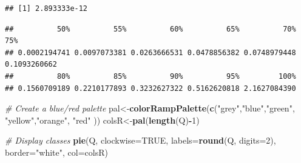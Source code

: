\documentclass[
]{article}
\newenvironment{Shaded}{\begin{snugshade}}{\end{snugshade}}
\newcommand{\AttributeTok}[1]{\textcolor[rgb]{0.13,0.29,0.53}{#1}}
\newcommand{\CommentTok}[1]{\textcolor[rgb]{0.56,0.35,0.01}{\textit{#1}}}
\newcommand{\ConstantTok}[1]{\textcolor[rgb]{0.56,0.35,0.01}{#1}}
\newcommand{\DecValTok}[1]{\textcolor[rgb]{0.00,0.00,0.81}{#1}}
\newcommand{\FloatTok}[1]{\textcolor[rgb]{0.00,0.00,0.81}{#1}}
\newcommand{\FunctionTok}[1]{\textcolor[rgb]{0.13,0.29,0.53}{\textbf{#1}}}
\newcommand{\NormalTok}[1]{#1}
\newcommand{\OtherTok}[1]{\textcolor[rgb]{0.56,0.35,0.01}{#1}}
\newcommand{\SpecialCharTok}[1]{\textcolor[rgb]{0.81,0.36,0.00}{\textbf{#1}}}
\newcommand{\StringTok}[1]{\textcolor[rgb]{0.31,0.60,0.02}{#1}}
\begin{document}
\begin{Shaded}
\end{Shaded}

\begin{verbatim}
## [1] 2.893333e-12
\end{verbatim}

\begin{Shaded}
\end{Shaded}

\begin{verbatim}
##          50%          55%          60%          65%          70%          75% 
## 0.0002194741 0.0097073381 0.0263666531 0.0478856382 0.0748979448 0.1093260662 
##          80%          85%          90%          95%         100% 
## 0.1560709189 0.2210177893 0.3232627322 0.5162620818 2.1627084390
\end{verbatim}

\begin{Shaded}
\begin{Highlighting}[]
\CommentTok{\# Create a blue/red palette}
\NormalTok{pal}\OtherTok{\textless{}{-}}\FunctionTok{colorRampPalette}\NormalTok{(}\FunctionTok{c}\NormalTok{(}\StringTok{"grey"}\NormalTok{,}\StringTok{"blue"}\NormalTok{,}\StringTok{"green"}\NormalTok{, }\StringTok{"yellow"}\NormalTok{,}\StringTok{"orange"}\NormalTok{, }\StringTok{"red"}\NormalTok{ ))}
\NormalTok{colsR}\OtherTok{\textless{}{-}}\FunctionTok{pal}\NormalTok{(}\FunctionTok{length}\NormalTok{(Q)}\SpecialCharTok{{-}}\DecValTok{1}\NormalTok{)}

\CommentTok{\# Display classes}
\FunctionTok{pie}\NormalTok{(Q, }\AttributeTok{clockwise=}\ConstantTok{TRUE}\NormalTok{, }\AttributeTok{labels=}\FunctionTok{round}\NormalTok{(Q, }\AttributeTok{digits=}\DecValTok{2}\NormalTok{), }\AttributeTok{border=}\StringTok{"white"}\NormalTok{, }\AttributeTok{col=}\NormalTok{colsR)}
\end{Highlighting}
\end{Shaded}
\end{document}
